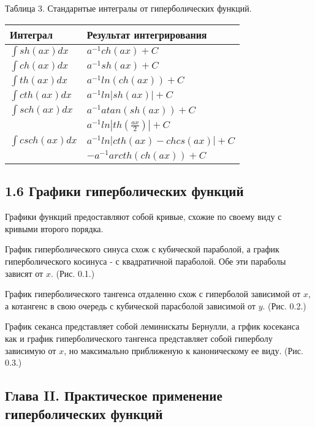 Таблица 3. Стандарнтые интегралы от гиперболических функций.
\begin{center}
    \begin{tabular}{| p{5cm} | p{7cm} |}
        \hline
        Интеграл & Результат интегрирования\\ \hline
       $\int sh(ax) dx$ & $a^{-1}ch(ax)+C$\\ \hline
       $\int ch(ax) dx$ & $a^{-1}sh(ax)+C$\\ \hline
       $\int th(ax) dx$ & $a^{-1}ln(ch(ax))+C$\\ \hline
       $\int cth(ax) dx$ & $a^{-1}ln|sh(ax)|+C$\\ \hline
       $\int sch(ax) dx$ & $a^{-1}atan(sh(ax))+C$\\ \hline
        & $a^{-1}ln|th(\frac{ax}{2})|+C$\\ 
       $\int csch(ax) dx$ & $a^{-1}ln|cth(ax)-chcs(ax)|+C$\\ 
        & $-a^{-1}arcth(ch(ax))+C$\\ \hline
    \end{tabular}
\end{center}

\subsection*{1.6 Графики гиперболических функций}
Графики функций предоставляют собой кривые, схожие по своему виду с кривыми второго порядка.

График гиперболического синуса схож с кубической параболой, а график гиперболического косинуса - с квадратичной параболой. Обе эти параболы зависят от $x$. (Рис. 0.1.) 

График гиперболического тангенса отдаленно схож с гиперболой зависимой от $x$, а котангенс в свою очередь с кубической парасболой зависимой от $y$. (Рис. 0.2.)

График секанса представляет собой %
леминискаты Бернулли, а грфик косеканса как и график гиперболического тангенса представляет собой гиперболу зависимую от $x$, но максимально приближеную к каноническому ее виду. (Рис. 0.3.)
\newpage
\subsection*{Глава II. Практическое применение гиперболических функций}
